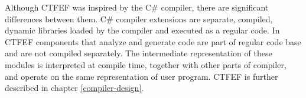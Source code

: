 Although CTFEF was inspired by the C\# compiler, there are significant differences between them.
C\# compiler extensions are separate, compiled, dynamic libraries loaded by the compiler and executed as a regular code.
In CTFEF components that analyze and generate code are part of regular code base and are not compiled separately.
The intermediate representation of these modules is interpreted at compile time, together with other parts of compiler, and operate on the same representation of user program.
CTFEF is further described in chapter \ref{compiler-design}.

